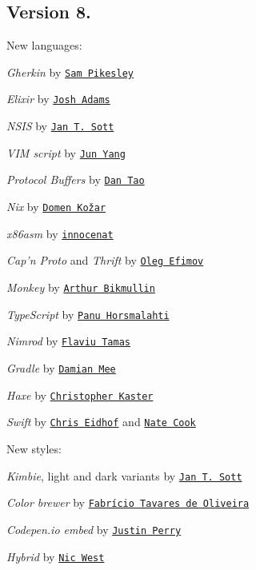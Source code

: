 \subsection*{Version 8.}

New languages\+:


\begin{DoxyItemize}
\item {\itshape Gherkin} by \href{https://github.com/pikesley}{\tt Sam Pikesley}
\item {\itshape Elixir} by \href{https://github.com/knewter}{\tt Josh Adams}
\item {\itshape N\+S\+IS} by \href{https://github.com/idleberg}{\tt Jan T. Sott}
\item {\itshape V\+IM script} by \href{https://github.com/harttle}{\tt Jun Yang}
\item {\itshape Protocol Buffers} by \href{https://github.com/dtao}{\tt Dan Tao}
\item {\itshape Nix} by \href{https://github.com/iElectric}{\tt Domen Kožar}
\item {\itshape x86asm} by \href{https://github.com/innocenat}{\tt innocenat}
\item {\itshape Cap’n Proto} and {\itshape Thrift} by \href{https://github.com/sannis}{\tt Oleg Efimov}
\item {\itshape Monkey} by \href{https://github.com/devolonter}{\tt Arthur Bikmullin}
\item {\itshape Type\+Script} by \href{https://github.com/panuhorsmalahti}{\tt Panu Horsmalahti}
\item {\itshape Nimrod} by \href{https://github.com/flaviut}{\tt Flaviu Tamas}
\item {\itshape Gradle} by \href{https://github.com/chester1000}{\tt Damian Mee}
\item {\itshape Haxe} by \href{http://christopher.kaster.ws}{\tt Christopher Kaster}
\item {\itshape Swift} by \href{https://github.com/chriseidhof}{\tt Chris Eidhof} and \href{https://github.com/natecook1000}{\tt Nate Cook}
\end{DoxyItemize}

New styles\+:


\begin{DoxyItemize}
\item {\itshape Kimbie}, light and dark variants by \href{https://github.com/idleberg}{\tt Jan T. Sott}
\item {\itshape Color brewer} by \href{https://github.com/fabriciotav}{\tt Fabrício Tavares de Oliveira}
\item {\itshape Codepen.\+io embed} by \href{https://github.com/ourmaninamsterdam}{\tt Justin Perry}
\item {\itshape Hybrid} by \href{https://github.com/nicwest}{\tt Nic West}
\end{DoxyItemize}

